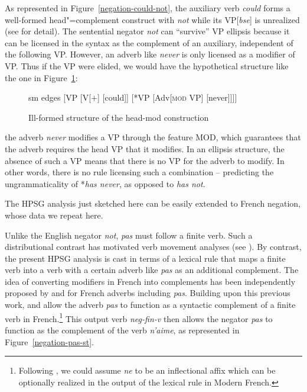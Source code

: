 \documentclass[output=paper
                ,modfonts
                ,nonflat
	        ,collection
	        ,collectionchapter
	        ,collectiontoclongg
 	        ,biblatex
                ,babelshorthands
                ,newtxmath
                ,draftmode
                ,colorlinks, citecolor=brown
]{./langsci/langscibook}
\begin{document}
{\begin{exe}
\begin{xlist}
\begin{exe}
\begin{xlist}
As represented in Figure~\ref{negation-could-not}, the auxiliary verb \textit{could} forms a well-formed head"=complement construct with \textit{not} while its
VP[\textit{bse}] is unrealized (see \citealt{Kim:00, KS:08} for
detail). The sentential negator \textit{not} can ``survive'' VP ellipsis because it can be
licensed in the syntax as the complement of an auxiliary, independent
of the following VP.  However, an adverb like \textit{never} is only
licensed as a modifier of VP. Thus if the VP were elided, we would have the hypothetical
structure like the one in Figure~\ref{negation-fig-could-never}:
\begin{figure}
	\begin{forest}
		sm edges
		[VP
			[V{[\aux $+$]}
				[could]]
			[*VP
				[Adv{[\textsc{mod} VP]}
					[never]]]]
	\end{forest}
\caption{Ill-formed structure of the head-mod construction}\label{negation-fig-could-never}
\end{figure}
the adverb \textit{never} modifies a VP through the feature \textsc{MOD},
which guarantees that the adverb requires the head VP that it
modifies. In an ellipsis structure, the absence of such a VP means
that there is no VP for the adverb to modify.  In other words, there
is no rule licensing such a combination -- predicting the
ungrammaticality of *\textit{has never},  as opposed to \textit{has not}.


The HPSG analysis just sketched here can be easily extended to French negation, whose
data we repeat here.

\eal
{}
\zl

\noindent
Unlike the English negator \textit{not}, \textit{pas} must follow a
finite verb. Such a distributional contrast has motivated verb
movement analyses (see \citealt{Pollock:89,Zanuttini:2001}).
By contrast, the present HPSG analysis is cast
in terms of a lexical rule that maps a finite verb into a verb
with a certain adverb like \textit{pas} as an additional complement.
 The idea of converting modifiers in French into
complements has been independently proposed by \citet{Miller92d-u} and
\citet{AG:94} for French adverbs including
\textit{pas}.  Building upon this
previous work, \citet{AG:97} and \citet{Kim:00}
allow the adverb \textit{pas} to function
as a syntactic complement of a finite verb in French.\footnote{Following \citet{AG:94}, we could assume \textit{ne} to
be an inflectional affix which can be optionally realized
in the output of the lexical rule in Modern French.}
This output verb \textit{neg-fin-v} then allows the negator \textit{pas} to function
as the complement of the verb \textit{n'aime}, as represented in Figure~\ref{negation-pas-st}.


\end{xlist}
\end{exe}
\end{xlist}
\end{exe}}
\end{document}

